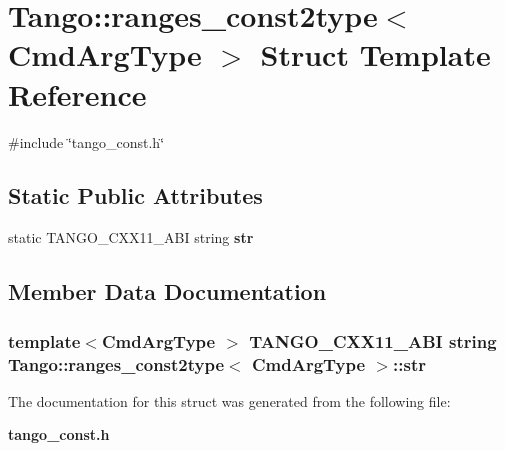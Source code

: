 \section{Tango\-:\-:ranges\-\_\-const2type$<$ Cmd\-Arg\-Type $>$ Struct Template Reference}
\label{structTango_1_1ranges__const2type}


{\ttfamily \#include \char`\"{}tango\-\_\-const.\-h\char`\"{}}

\subsection*{Static Public Attributes}
\begin{DoxyCompactItemize}
\item 
static T\-A\-N\-G\-O\-\_\-\-C\-X\-X11\-\_\-\-A\-B\-I string {\bf str}
\end{DoxyCompactItemize}


\subsection{Member Data Documentation}
\subsubsection[{str}]{\setlength{\rightskip}{0pt plus 5cm}template$<$Cmd\-Arg\-Type $>$ T\-A\-N\-G\-O\-\_\-\-C\-X\-X11\-\_\-\-A\-B\-I string {\bf Tango\-::ranges\-\_\-const2type}$<$ {\bf Cmd\-Arg\-Type} $>$\-::str\hspace{0.3cm}{\ttfamily [static]}}\label{structTango_1_1ranges__const2type_a8fbfef3cf42746368ecfebf2468ad781}


The documentation for this struct was generated from the following file\-:\begin{DoxyCompactItemize}
\item 
{\bf tango\-\_\-const.\-h}\end{DoxyCompactItemize}
